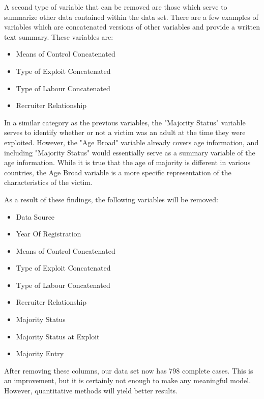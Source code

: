 \documentclass{article} %
\begin{document}
	A second type of variable that can be removed are those which serve to summarize other data contained within the data set. There are a few examples of variables which are concatenated versions of other variables and provide a written text summary. These variables are:
	
	\begin{multicols}{2}
		\begin{itemize}
			\item Means of Control Concatenated
			\item Type of Exploit Concatenated
			\item Type of Labour Concatenated
			\item Recruiter Relationship
		\end{itemize}
	\end{multicols}
	
	In a similar category as the previous variables, the "Majority Status" variable serves to identify whether or not a victim was an adult at the time they were exploited. However, the "Age Broad" variable already covers age information, and including "Majority Status" would essentially serve as a summary variable of the age information. While it is true that the age of majority is different in various countries, the Age Broad variable is a more specific representation of the characteristics of the victim.
	
	As a result of these findings, the following variables will be removed:
	
	\begin{multicols}{2}
		\begin{itemize}
		\item Data Source
		\item Year Of Registration
		\item Means of Control Concatenated
		\item Type of Exploit Concatenated
		\item Type of Labour Concatenated
		\item Recruiter Relationship
		\item Majority Status
		\item Majority Status at Exploit
		\item Majority Entry
	\end{itemize}
	\end{multicols}
	
	After removing these columns, our data set now has 798 complete cases. This is an improvement, but it is certainly not enough to make any meaningful model. However, quantitative methods will yield better results.
\end{document}
